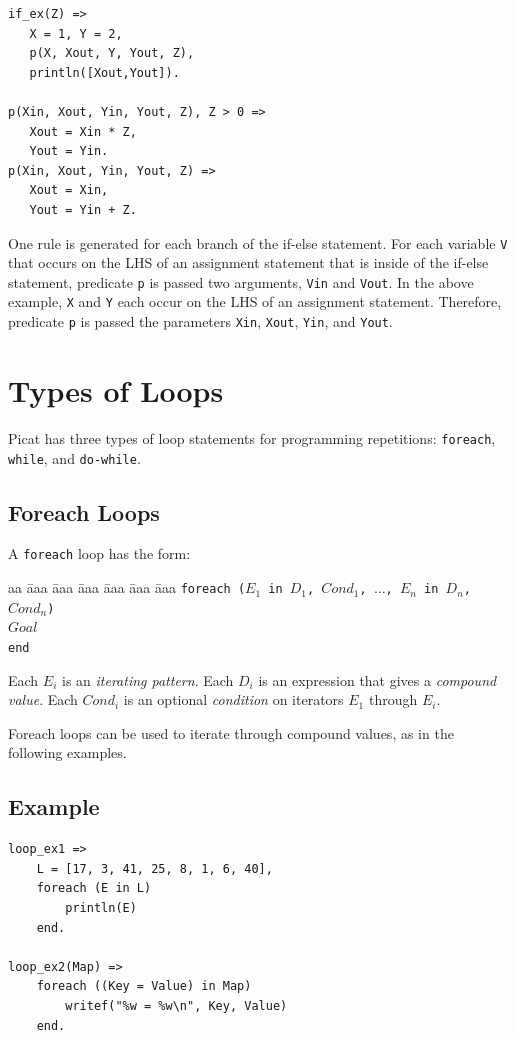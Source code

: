 \begin{verbatim}
if_ex(Z) => 
   X = 1, Y = 2, 
   p(X, Xout, Y, Yout, Z),
   println([Xout,Yout]).

p(Xin, Xout, Yin, Yout, Z), Z > 0 =>
   Xout = Xin * Z,
   Yout = Yin.
p(Xin, Xout, Yin, Yout, Z) =>
   Xout = Xin,
   Yout = Yin + Z.
\end{verbatim}
One rule is generated for each branch of the if-else statement.  For each variable \texttt{V} that occurs on the LHS of an assignment statement that is inside of the if-else statement, predicate \texttt{p} is passed two arguments, \texttt{Vin} and \texttt{Vout}.  In the above example, \texttt{X} and \texttt{Y} each occur on the LHS of an assignment statement.  Therefore, predicate \texttt{p} is passed the parameters \texttt{Xin}, \texttt{Xout}, \texttt{Yin}, and \texttt{Yout}. 

\section{Types of Loops}
Picat has three types of loop statements for programming repetitions: \texttt{foreach}, \texttt{while}, and \texttt{do-while}.

\subsection{Foreach Loops}
A \texttt{foreach} loop has the form:
\begin{tabbing}
aa \= aaa \= aaa \= aaa \= aaa \= aaa \= aaa \kill
\> \texttt{foreach ($E_1$ in $D_1$, $Cond_1$, $\ldots$, $E_n$ in $D_n$, $Cond_n$)}  \\
\> \> $Goal$ \\
\>  \texttt{end} 
\end{tabbing}
Each $E_i$ is an \emph{iterating pattern}.  Each $D_i$ is an expression that gives a \emph{compound value}.  Each $Cond_i$ is an optional \emph{condition} on iterators $E_1$ through $E_i$. 

Foreach loops can be used to iterate through compound values, as in the following examples.

\subsection*{Example}
\begin{verbatim}
loop_ex1 =>
    L = [17, 3, 41, 25, 8, 1, 6, 40],
    foreach (E in L)
        println(E)
    end.

loop_ex2(Map) =>
    foreach ((Key = Value) in Map)
        writef("%w = %w\n", Key, Value)
    end.
\end{verbatim}


